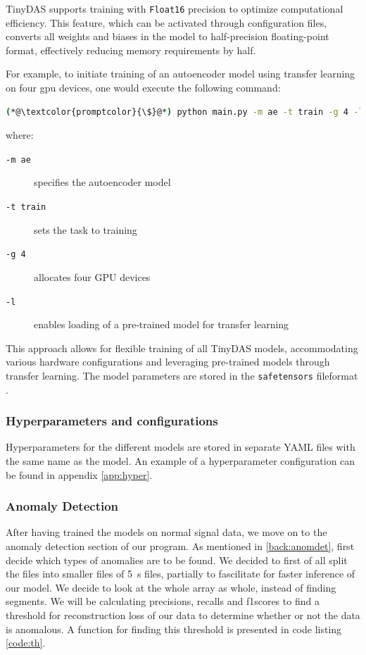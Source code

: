 

TinyDAS supports training with \texttt{Float16} precision to optimize computational efficiency. This feature, which can be activated through configuration files, converts all weights and biases in the model to half-precision floating-point format, effectively reducing memory requirements by half.

For example, to initiate training of an autoencoder model using transfer learning on four \acrshort{gpu} devices, one would execute the following command:
\begin{lstlisting}[style=shellcommand, language=bash]
(*@\textcolor{promptcolor}{\$}@*) python main.py -m ae -t train -g 4 -l
\end{lstlisting}

where:
\begin{description}
\item[\texttt{-m ae}] specifies the autoencoder model
\item[\texttt{-t train}] sets the task to training
\item[\texttt{-g 4}] allocates four GPU devices
\item[\texttt{-l}] enables loading of a pre-trained model for transfer learning
\end{description}

This approach allows for flexible training of all TinyDAS models, accommodating various hardware configurations and leveraging pre-trained models through transfer learning. The model parameters are stored in the \texttt{safetensors} fileformat \cite{safetensors}.

\subsubsection{Hyperparameters and configurations}

Hyperparameters for the different models are stored in separate YAML files with the same name as the model. An example of a hyperparameter configuration can be found in appendix \ref{app:hyper}.


\subsubsection{Anomaly Detection}

After having trained the models on normal signal data, we move on to the anomaly detection section of our program. As mentioned in \ref{back:anomdet}, first decide which types of anomalies are to be found. We decided to first of all split the files into smaller files of \qty{5}{\si{\second}} files, partially to fascilitate for faster inference of our model. We decide to look at the whole array as whole, instead of finding segments. We will be calculating precisions, recalls and f1scores to find a threshold for reconstruction loss of our data to determine whether or not the data is anomalous. A function for finding this threshold is presented in code listing \ref{code:th}.  \\

